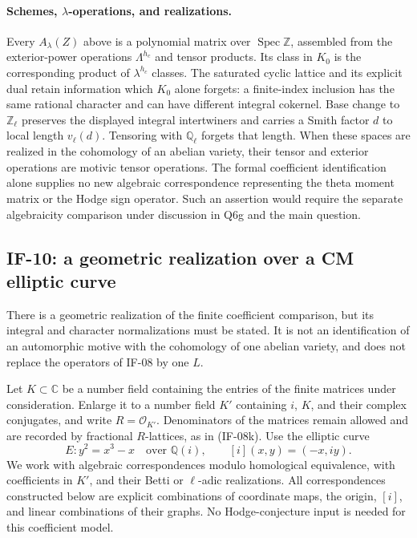 \documentclass[11pt,a4paper]{article}
\theoremstyle{definition}
\theoremstyle{remark}
\begin{document}
\paragraph{Schemes, $\lambda$-operations, and realizations.}
Every $A_\lambda(Z)$ above is a polynomial matrix over
$\operatorname{Spec}\mathbb Z$, assembled from the exterior-power
operations $\Lambda^{h_c}$ and tensor products. Its class in $K_0$
is the corresponding product of $\lambda^{h_c}$ classes. The
saturated cyclic lattice and its explicit dual retain information
which $K_0$ alone forgets: a finite-index inclusion has the same
rational character and can have different integral cokernel.
Base change to $\mathbb Z_\ell$ preserves the displayed integral
intertwiners and carries a Smith factor $d$ to local length
$v_\ell(d)$. Tensoring with $\mathbb Q_\ell$ forgets that length.
When these spaces are realized in the cohomology of an abelian
variety, their tensor and exterior operations are motivic tensor
operations. The formal coefficient identification alone supplies no
new algebraic correspondence representing the theta moment matrix
or the Hodge sign operator. Such an assertion would require the
separate algebraicity comparison under discussion in Q6g and the
main question.


\subsection{IF-10: a geometric realization over a CM elliptic curve}
There is a geometric realization of the finite coefficient comparison,
but its integral and character normalizations must be stated. It is not
an identification of an automorphic motive with the cohomology of one
abelian variety, and does not replace the operators of IF-08 by one $L$.

Let $K\subset\mathbb C$ be a number field containing the entries of the
finite matrices under consideration. Enlarge it to a number field
$K'$ containing $i$, $K$, and their complex conjugates, and write
$R=\mathcal O_{K'}$. Denominators of the matrices remain allowed and are
recorded by fractional $R$-lattices, as in (IF-08k). Use the elliptic curve
\[
 E:y^2=x^3-x\quad\text{over }\mathbb Q(i),\qquad
 [i](x,y)=(-x,iy).
\]
We work with algebraic correspondences modulo homological equivalence,
with coefficients in $K'$, and their Betti or $\ell$-adic realizations.
All correspondences constructed below are explicit combinations of
coordinate maps, the origin, $[i]$, and linear combinations of their
graphs. No Hodge-conjecture input is needed for this coefficient model.
\end{document}
